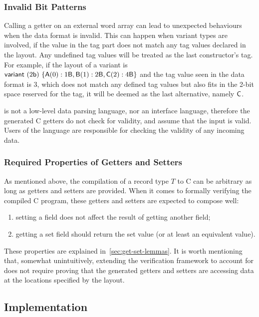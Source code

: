 
\subsubsection{Invalid Bit Patterns}
Calling a getter on an external word array can lead to unexpected behaviours
when the
data format is invalid. This can happen when variant types are involved, if
the value in the tag part does not match any tag values declared in the
\dargent layout. Any undefined tag values will be treated as the last
constructor's tag. For example, if the layout of a variant
is $\mathsf{variant}\ (2\mathsf{b})\ \{ \mathsf{A}(0) : 1\mathsf{B}, \mathsf{B}(1) : 2\mathsf{B},
\mathsf{C}(2) : 4\mathsf{B} \}$
and the tag value seen in the data format is 3, which does not match
any defined tag values but also fits in
the 2-bit space reserved for the tag, it will be deemed as the last
alternative, namely $\mathsf{C}$.

\dargent is not a low-level data parsing language, nor an interface language,
therefore the generated C getters do not check for validity, and
assume that the input is valid. Users of the language are responsible for
checking the validity of any incoming data.

\subsubsection{Required Properties of Getters and Setters}
As mentioned above, the compilation of a \cogent record type $T$ to C
can be arbitrary as long as getters and setters are provided. When it
comes to formally verifying the compiled C program, these getters and setters
are expected to compose well:
\begin{enumerate}\item 
  setting a field does not affect the result of getting another field;
\item getting a set field should return the set value (or at least an
  equivalent value).
\end{enumerate}
%
These properties are explained 
in~\autoref{sec:get-set-lemmas}. It is worth mentioning that, somewhat unintuitively,
extending the verification
framework to account for \Dargent does not require proving that
the generated getters and setters are accessing data at the locations
specified by the layout.

\subsection{Implementation}

